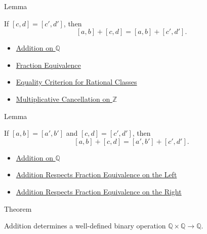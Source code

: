 \begin{lemmabox}{Lemma}
\begin{lemma}
\label{lem:addition-on-q-respects-right-equivalence}
If $[c,d]=[c',d']$, then
\[
[a,b]+[c,d]=[a,b]+[c',d'].
\]
\end{lemma}
\end{lemmabox}

\begin{dependencies}
\begin{itemize}
  \item \hyperref[def:addition-on-q-classes]{Addition on $\mathbb{Q}$}
  \item \hyperref[def:fraction-equivalence]{Fraction Equivalence}
  \item \hyperref[prop:equality-criterion-for-rational-classes]{Equality Criterion for Rational Classes}
  \item \hyperref[cor:multiplicative-cancellation-on-z]{Multiplicative Cancellation on $\mathbb{Z}$}
\end{itemize}
\end{dependencies}

\begin{lemmabox}{Lemma}
\begin{lemma}
\label{lem:addition-on-q-respects-equivalence}
If $[a,b]=[a',b']$ and $[c,d]=[c',d']$, then
\[
[a,b]+[c,d]=[a',b']+[c',d'].
\]
\end{lemma}
\end{lemmabox}

\begin{dependencies}
\begin{itemize}
  \item \hyperref[def:addition-on-q-classes]{Addition on $\mathbb{Q}$}
  \item \hyperref[lem:addition-on-q-respects-left-equivalence]{Addition Respects Fraction Equivalence on the Left}
  \item \hyperref[lem:addition-on-q-respects-right-equivalence]{Addition Respects Fraction Equivalence on the Right}
\end{itemize}
\end{dependencies}

\begin{theorembox}{Theorem}
\begin{theorem}
\label{thm:addition-on-q-well-defined}
Addition determines a well-defined binary operation
$\mathbb{Q}\times\mathbb{Q}\to\mathbb{Q}$.
\end{theorem}
\end{theorembox}

